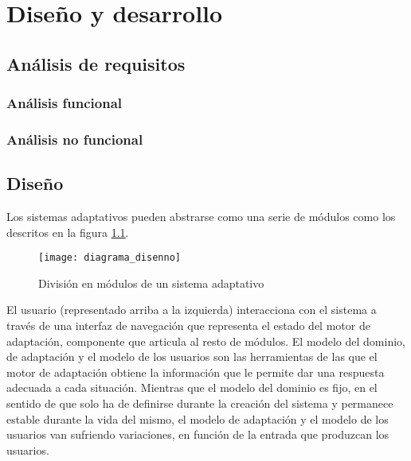 \chapter{Diseño y desarrollo\label{sec:disenhoYDesarrollo}}



\section{Análisis de requisitos}

\subsection{Análisis funcional}

\subsection{Análisis no funcional}


\section{Diseño}

Los sistemas adaptativos pueden abstrarse como una serie de módulos como los descritos en la figura \ref{fig:diagrama_disenno}. 

\begin{figure}[htp!]
	\centering
	\texttt{[image: diagrama\_disenno]}
	\caption{División en módulos de un sistema adaptativo}
	\label{fig:diagrama_disenno}
\end{figure}

El usuario (representado arriba a la izquierda) interacciona con el sistema a través de una interfaz de navegación que representa el estado del motor de adaptación, componente que articula al resto de módulos. El modelo del dominio, de adaptación y el modelo de los usuarios son las herramientas de las que el motor de adaptación obtiene la información que le permite dar una respuesta adecuada a cada situación. Mientras que el modelo del dominio es fijo, en el sentido de que solo ha de definirse durante la creación del sistema y permanece estable durante la vida del mismo, el modelo de adaptación y el modelo de los usuarios van sufriendo variaciones, en función de la entrada que produzcan los usuarios.

